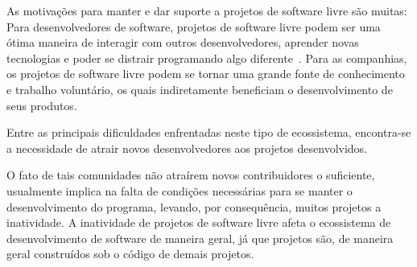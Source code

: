 As motivações para manter e dar suporte a projetos de software livre são muitas: Para desenvolvedores de software, projetos de software livre podem ser uma ótima maneira de interagir com outros desenvolvedores, aprender novas tecnologias e poder se distrair programando algo diferente~\citep{raymond1999cathedral,torvalds2001just}. Para as companhias, os projetos de software livre podem se tornar uma grande fonte de conhecimento e trabalho voluntário, os quais indiretamente beneficiam o desenvolvimento de seus produtos.

 Entre as principais dificuldades enfrentadas neste tipo de ecossistema, encontra-se a necessidade de atrair novos desenvolvedores aos projetos desenvolvidos.
 
O fato de tais comunidades não atraírem novos contribuidores o suficiente, usualmente implica na falta de condições necessárias para se manter o desenvolvimento do programa, levando, por consequência, muitos projetos a inatividade. A inatividade de projetos de software livre afeta o ecossistema de desenvolvimento de software de maneira geral, já que projetos são, de maneira geral construídos sob o código de demais projetos.
